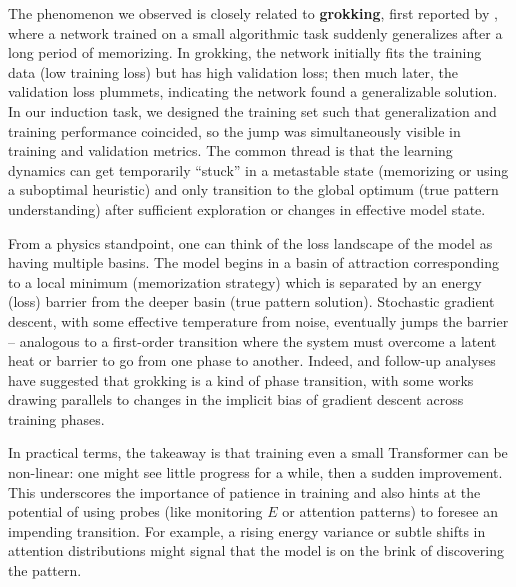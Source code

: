 \documentclass[12pt]{article}
\begin{document}
The phenomenon we observed is closely related to \textbf{grokking}, first reported by \citet{power2022}, where a network trained on a small algorithmic task suddenly generalizes after a long period of memorizing. In grokking, the network initially fits the training data (low training loss) but has high validation loss; then much later, the validation loss plummets, indicating the network found a generalizable solution. In our induction task, we designed the training set such that generalization and training performance coincided, so the jump was simultaneously visible in training and validation metrics. The common thread is that the learning dynamics can get temporarily ``stuck'' in a metastable state (memorizing or using a suboptimal heuristic) and only transition to the global optimum (true pattern understanding) after sufficient exploration or changes in effective model state.

From a physics standpoint, one can think of the loss landscape of the model as having multiple basins. The model begins in a basin of attraction corresponding to a local minimum (memorization strategy) which is separated by an energy (loss) barrier from the deeper basin (true pattern solution). Stochastic gradient descent, with some effective temperature from noise, eventually jumps the barrier -- analogous to a first-order transition where the system must overcome a latent heat or barrier to go from one phase to another. Indeed, \citet{power2022} and follow-up analyses have suggested that grokking is a kind of phase transition, with some works drawing parallels to changes in the implicit bias of gradient descent across training phases.

In practical terms, the takeaway is that training even a small Transformer can be non-linear: one might see little progress for a while, then a sudden improvement. This underscores the importance of patience in training and also hints at the potential of using probes (like monitoring $E$ or attention patterns) to foresee an impending transition. For example, a rising energy variance or subtle shifts in attention distributions might signal that the model is on the brink of discovering the pattern.
\end{document}
